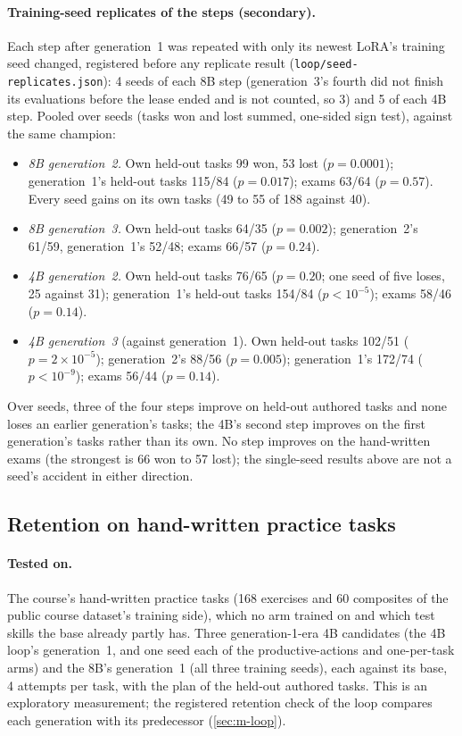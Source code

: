 \paragraph{Training-seed replicates of the steps (secondary).} Each step after generation~1 was repeated with only its newest
LoRA's training seed changed, registered before any replicate result (\nolinkurl{loop/seed-replicates.json}): 4 seeds of each
8B step (generation~3's fourth did not finish its evaluations before the lease ended and is not counted, so 3) and 5 of each
4B step. Pooled over seeds (tasks won and lost summed, one-sided sign test), against the same champion:
\begin{itemize}
\item \emph{8B generation~2.} Own held-out tasks 99 won, 53 lost ($p=0.0001$); generation~1's held-out tasks 115/84
  ($p=0.017$); exams 63/64 ($p=0.57$). Every seed gains on its own tasks (49 to 55 of 188 against 40).
\item \emph{8B generation~3.} Own held-out tasks 64/35 ($p=0.002$); generation~2's 61/59, generation~1's 52/48; exams 66/57
  ($p=0.24$).
\item \emph{4B generation~2.} Own held-out tasks 76/65 ($p=0.20$; one seed of five loses, 25 against 31); generation~1's
  held-out tasks 154/84 ($p<10^{-5}$); exams 58/46 ($p=0.14$).
\item \emph{4B generation~3} (against generation~1). Own held-out tasks 102/51 ($p=2\times10^{-5}$); generation~2's 88/56
  ($p=0.005$); generation~1's 172/74 ($p<10^{-9}$); exams 56/44 ($p=0.14$).
\end{itemize}
Over seeds, three of the four steps improve on held-out authored tasks and none loses an earlier generation's tasks; the
4B's second step improves on the first generation's tasks rather than its own. No step improves on the hand-written exams
(the strongest is 66 won to 57 lost); the single-seed results above are not a seed's accident in either direction.

\subsection{Retention on hand-written practice tasks}\label{sec:r-retention}

\paragraph{Tested on.} The course's \RetainTasks{} hand-written practice tasks (168 exercises and 60 composites of the
public course dataset's training side), which no arm trained on and which test skills the base already partly has. Three
generation-1-era 4B candidates (the 4B loop's generation~1, and one seed each of the productive-actions and one-per-task arms)
and the 8B's generation~1 (all three training seeds), each against its base, 4 attempts per task, with the plan of the held-out authored
tasks. This is an exploratory measurement; the registered retention check of the loop compares each generation with its predecessor (\cref{sec:m-loop}).

